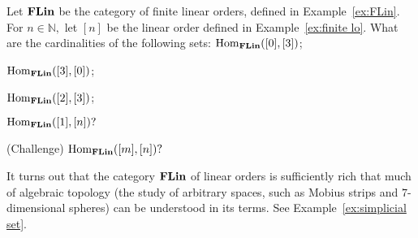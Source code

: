 \documentclass[../main/CT4S-EN-RU]{subfiles}
\begin{document}
\begin{exampleRUS}\label{ex:FLin}
\end{exampleRUS}

\begin{exerciseENG}
Let ${\mathbf{FLin}}$ be the category of finite linear orders, defined in Example~\ref{ex:FLin}. For $n\in{ℕ},$ let $[n]$ be the linear order defined in Example~\ref{ex:finite lo}. What are the cardinalities of the following sets: 
\sexc $\operatorname{Hom}_{{\mathbf{FLin}}}([0],[3])$; 
\item $\operatorname{Hom}_{\mathbf{FLin}}([3],[0])$;
\item $\operatorname{Hom}_{\mathbf{FLin}}([2],[3])$;
\item $\operatorname{Hom}_{\mathbf{FLin}}([1],[n])?$
\item (Challenge) $\operatorname{Hom}_{\mathbf{FLin}}([m],[n])?$
\endsexc

It turns out that the category ${\mathbf{FLin}}$ of linear orders is sufficiently rich that much of algebraic topology (the study of arbitrary spaces, such as Mobius strips and $7$-dimensional spheres) can be understood in its terms. See Example~\ref{ex:simplicial set}.
\end{exerciseENG}

\begin{exerciseRUS}
\end{exerciseRUS}
\end{document}
